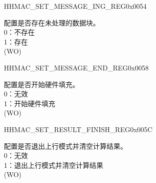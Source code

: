 \begin{register}{H}{HMAC\_SET\_MESSAGE\_ING\_REG}{0x0054}\label{regdesc:HMACSETMESSAGEINGREG}
%
%
\regnewline%
\begin{regdesc}\begin{reglist}
\label{fielddesc:HMACSETTEXTING}\item [HMAC\_SET\_TEXT\_ING] 配置是否存在未处理的数据块。
\\0：不存在
\\1：存在
\\(WO)
\end{reglist}\end{regdesc}
\end{register}


\begin{register}{H}{HMAC\_SET\_MESSAGE\_END\_REG}{0x0058}\label{regdesc:HMACSETMESSAGEENDREG}
%
%
\regnewline%
\begin{regdesc}\begin{reglist}
\label{fielddesc:HMACSETTEXTEND}\item [HMAC\_SET\_TEXT\_END] 配置是否开始硬件填充。
\\0：无效
\\1：开始硬件填充
\\(WO)
\end{reglist}\end{regdesc}
\end{register}


\begin{register}{H}{HMAC\_SET\_RESULT\_FINISH\_REG}{0x005C}\label{regdesc:HMACSETRESULTFINISHREG}
%
%
\regnewline%
\begin{regdesc}\begin{reglist}
\label{fielddesc:HMACSETRESULTEND}\item [HMAC\_SET\_RESULT\_END] 配置是否退出上行模式并清空计算结果。
\\0：无效
\\1：退出上行模式并清空计算结果
\\(WO)
\end{reglist}\end{regdesc}
\end{register}


